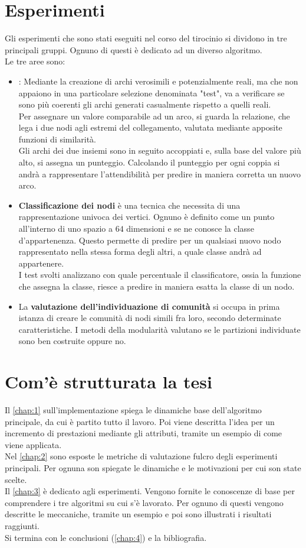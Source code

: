 \section{Esperimenti}
Gli esperimenti che sono stati eseguiti nel corso del tirocinio si dividono in tre principali gruppi. Ognuno di questi è dedicato ad un diverso algoritmo.\\
Le tre aree sono:
\begin{itemize}
	\item \textbf{\LPred}: Mediante la creazione di archi verosimili e potenzialmente reali, ma che non appaiono in una particolare selezione denominata "test", va a verificare se sono più coerenti gli archi generati casualmente rispetto a quelli reali.\\
	Per assegnare un valore comparabile ad un arco, si guarda la relazione, che lega i due nodi agli estremi del collegamento, valutata mediante apposite funzioni di similarità.\\
	Gli archi dei due insiemi sono in seguito accoppiati e, sulla base del valore più alto, si assegna un punteggio. Calcolando il punteggio per ogni coppia si andrà a rappresentare l'attendibilità per predire in maniera corretta un nuovo arco.
	\item \textbf{Classificazione dei nodi} è una tecnica che necessita di una rappresentazione univoca dei vertici. Ognuno è definito come un punto all'interno di uno spazio a $64$ dimensioni e se ne conosce la classe d'appartenenza. Questo permette di predire per un qualsiasi nuovo nodo rappresentato nella stessa forma degli altri, a quale classe andrà ad appartenere.\\
	I test svolti analizzano con quale percentuale il classificatore, ossia la funzione che assegna la classe, riesce a predire in maniera esatta la classe di un nodo.
	\item La \textbf{valutazione dell'individuazione di comunità} si occupa in prima istanza di creare le comunità di nodi simili fra loro, secondo determinate caratteristiche. I metodi della modularità valutano se le partizioni individuate sono ben costruite oppure no.
\end{itemize}
%
\section{Com'è strutturata la tesi}
Il \autoref{chap:1} sull'implementazione spiega le dinamiche base dell'algoritmo principale, da cui è partito tutto il lavoro. Poi viene descritta l'idea per un incremento di prestazioni mediante gli attributi, tramite un esempio di come viene applicata.\\
Nel \autoref{chap:2} sono esposte le metriche di valutazione fulcro degli esperimenti principali. Per ognuna son spiegate le dinamiche e le motivazioni per cui son state scelte.\\
Il \autoref{chap:3} è dedicato agli esperimenti. Vengono fornite le conoscenze di base per comprendere i tre algoritmi su cui s'è lavorato. Per ognuno di questi vengono descritte le meccaniche, tramite un esempio e poi sono illustrati i risultati raggiunti.\\
Si termina con le conclusioni (\autoref{chap:4}) e la bibliografia.
%

\newpage
%



